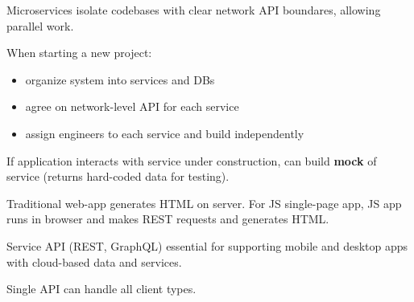 \documentclass[11pt]{article}
\begin{document}
Microservices isolate codebases with clear network API boundares, allowing parallel work.

When starting a new project:
\begin{itemize}
\item organize system into services and DBs
\item agree on network-level API for each service
\item assign engineers to each service and build independently
\end{itemize}

If application interacts with service under construction, can build \textbf{mock} of service (returns
hard-coded data for testing).

Traditional web-app generates HTML on server.
For JS single-page app, JS app runs in browser and makes REST requests and generates HTML.

Service API (REST, GraphQL) essential for supporting mobile and desktop apps with cloud-based data
and services.

Single API can handle all client types.
\end{document}
